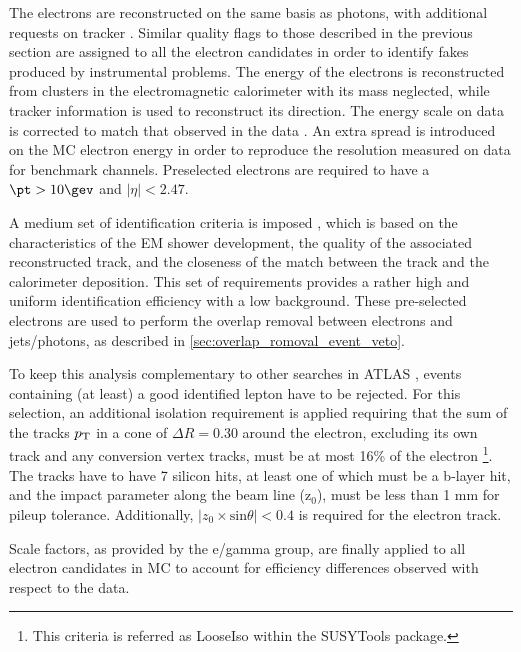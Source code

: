 The electrons are reconstructed on the same basis as photons, with additional requests on tracker \cite{Aad:2011mk}. Similar quality flags to those described in the previous section are assigned to all the electron candidates in order to identify fakes produced by instrumental problems.
The energy of the electrons is reconstructed from clusters in the electromagnetic calorimeter with its mass neglected, while tracker information is used to reconstruct its direction. The energy scale on data is corrected to match that observed in the data \cite{EGScaleTwiki}. An extra spread is introduced on the MC electron energy in order to reproduce the resolution measured on data for benchmark channels. Preselected electrons are required to have a $\pt>10\gev$ and $|\eta|<2.47$.

A medium set of identification criteria is imposed \cite{ATL-PHYS-PUB-2011-006}, which is based on the characteristics of the EM shower development, the quality of the associated reconstructed track, and the closeness of the match between the track and the calorimeter deposition. This set of requirements provides a rather high and uniform identification efficiency with a low background.
These pre-selected electrons are used to perform the overlap removal
between electrons and jets/photons, as described in \Sec \ref{sec:overlap_romoval_event_veto}.

To keep this analysis complementary to other searches in ATLAS \cite{leptonphoton7,Zplusmet7}, %
events containing (at least) a good identified lepton have to be rejected. For this selection, an additional isolation requirement is applied requiring that the sum of the tracks $p_{\rm T}$ in a cone of $\Delta R = 0.30$ around the electron, excluding its own track and any conversion vertex tracks, must be at most 16\% of the electron \pt \footnote{This criteria is referred as LooseIso within the SUSYTools package.}. The tracks have to have 7 silicon hits, at least one of which must be a b-layer hit, and the impact parameter along the beam line (z$_0$), must be less than 1 mm for pileup tolerance. Additionally,  $|z_0 \times \mathrm{sin} \theta | < 0.4$ is required for the electron track.

Scale factors, as provided by the e/gamma group, are finally applied to all electron candidates in MC to account for efficiency differences observed with respect to the data.


